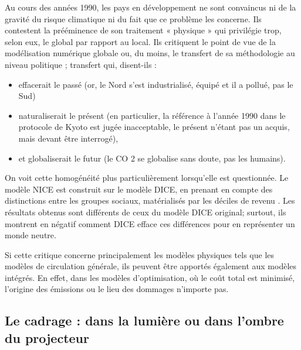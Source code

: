 \begin{authoredquote}
    Au cours des années 1990, les pays en développement ne sont convaincus ni de la gravité du risque climatique ni du fait que ce problème les concerne. Ils contestent la prééminence de son traitement « physique » qui privilégie trop, selon eux, le global par rapport au local. Ils critiquent le point de vue de la modélisation numérique globale ou, du moins, le transfert de sa méthodologie au niveau politique ; transfert qui, disent-ils :  
    \begin{itemize}
        \item effacerait le passé (or, le Nord s’est industrialisé, équipé et il a pollué, pas le Sud)
	    \item naturaliserait le présent (en particulier, la référence à l’année 1990 dans le protocole de Kyoto est jugée inacceptable, le présent n’étant pas un acquis, mais devant être interrogé),
	   \item et globaliserait le futur (le CO 2 se globalise sans doute, pas les humains).
    \end{itemize}
\end{authoredquote}

On voit cette homogénéité plus particulièrement lorsqu'elle est questionnée. Le modèle NICE est construit sur le modèle DICE, en prenant en compte des distinctions entre les groupes sociaux, matérialisés par les déciles de revenu \autocite{dennig_inequality_2015}. Les résultats obtenus sont différents de ceux du modèle DICE original; surtout, ils montrent en négatif comment DICE efface ces différences pour en représenter un monde neutre. 

Si cette critique concerne principalement les modèles physiques tels que les modèles de circulation générale, ils peuvent être apportés également aux modèles intégrés. En effet, dans les modèles d'optimisation, où le coût total est minimisé, l'origine des émissions ou le lieu des dommages n'importe pas.  


\subsection{Le cadrage : dans la lumière ou dans l'ombre du projecteur}
\label{ss:cadrage}

